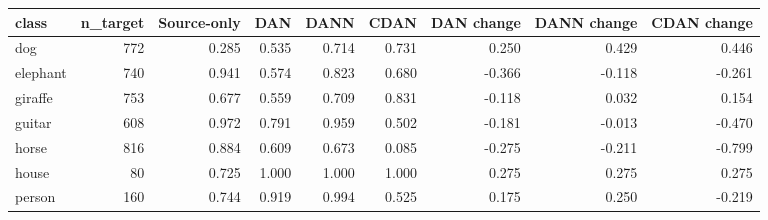 \begin{tabular}{lrrrrrrrr}
\toprule
class & n\_target & Source-only & DAN & DANN & CDAN & DAN change & DANN change & CDAN change \\
\midrule
dog & 772 & 0.285 & 0.535 & 0.714 & 0.731 & 0.250 & 0.429 & 0.446 \\
elephant & 740 & 0.941 & 0.574 & 0.823 & 0.680 & -0.366 & -0.118 & -0.261 \\
giraffe & 753 & 0.677 & 0.559 & 0.709 & 0.831 & -0.118 & 0.032 & 0.154 \\
guitar & 608 & 0.972 & 0.791 & 0.959 & 0.502 & -0.181 & -0.013 & -0.470 \\
horse & 816 & 0.884 & 0.609 & 0.673 & 0.085 & -0.275 & -0.211 & -0.799 \\
house & 80 & 0.725 & 1.000 & 1.000 & 1.000 & 0.275 & 0.275 & 0.275 \\
person & 160 & 0.744 & 0.919 & 0.994 & 0.525 & 0.175 & 0.250 & -0.219 \\
\bottomrule
\end{tabular}
